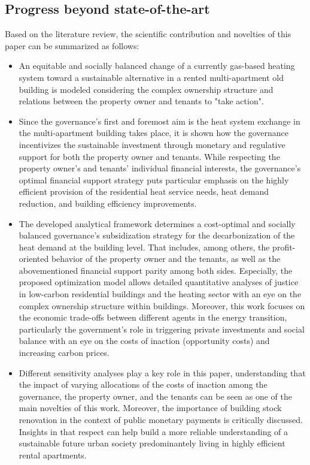\subsection{Progress beyond state-of-the-art}\label{novelties}
Based on the literature review, the scientific contribution and novelties of this paper can be summarized as follows:
\begin{itemize}
	\item An equitable and socially balanced change of a currently gas-based heating system toward a sustainable alternative in a rented multi-apartment old building is modeled considering the complex ownership structure and relations between the property owner and tenants to "take action".
	\item Since the governance's first and foremost aim is  the heat system exchange in the multi-apartment building takes place, it is shown how the governance incentivizes the sustainable investment through monetary and regulative support for both the property owner and tenants. While respecting the property owner's and tenants' individual financial interests, the governance's optimal financial support strategy puts particular emphasis on the highly efficient provision of the residential heat service needs, heat demand reduction, and building efficiency improvements.
	\item The developed analytical framework determines a cost-optimal and socially balanced governance’s subsidization strategy for the decarbonization of the heat demand at the building level. That includes, among others, the profit-oriented behavior of the property owner and the tenants, as well as the abovementioned financial support parity among both sides.  Especially, the proposed optimization model allows detailed quantitative analyses of justice in low-carbon residential buildings and the heating sector with an eye on the complex ownership structure within buildings. Moreover, this work focuses on the economic trade-offs between different agents in the energy transition, particularly the government’s role in triggering private investments and social balance with an eye on the costs of inaction (opportunity costs) and increasing carbon prices.	
	\item Different sensitivity analyses play a key role in this paper, understanding that the impact of varying allocations of the costs of inaction among the governance, the property owner, and the tenants can be seen as one of the main novelties of this work. Moreover, the importance of building stock renovation in the context of public monetary payments is critically discussed. Insights in that respect can help build a more reliable understanding of a sustainable future urban society predominantely living in highly efficient rental apartments.
\end{itemize}